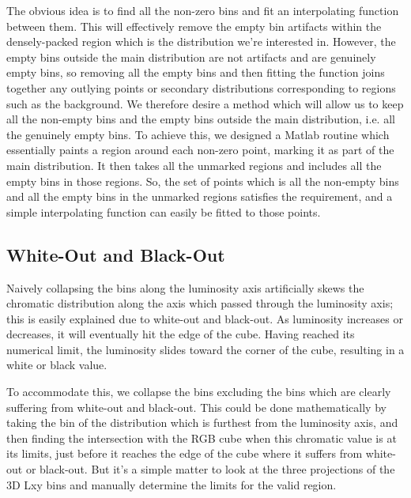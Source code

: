 The obvious idea is to find all the non-zero bins and fit an interpolating function between them. This will effectively remove the empty bin artifacts within the densely-packed region which is the distribution we're interested in. However, the empty bins outside the main distribution are not artifacts and are genuinely empty bins, so removing all the empty bins and then fitting the function joins together any outlying points or secondary distributions corresponding to regions such as the background. We therefore desire a method which will allow us to keep all the non-empty bins and the empty bins outside the main distribution, i.e. all the genuinely empty bins. To achieve this, we designed a Matlab routine which essentially paints a region around each non-zero point, marking it as part of the main distribution. It then takes all the unmarked regions and includes all the empty bins in those regions. So, the set of points which is all the non-empty bins and all the empty bins in the unmarked regions satisfies the requirement, and a simple interpolating function can easily be fitted to those points.


\subsection{White-Out and Black-Out}\label{sec:WhiteOutBlackOut}

Naively collapsing the bins along the luminosity axis artificially skews the chromatic distribution along the axis which passed through the luminosity axis; this is easily explained due to white-out and black-out. As luminosity increases or decreases, it will eventually hit the edge of the cube. Having reached its numerical limit, the luminosity slides toward the corner of the cube, resulting in a white or black value.

To accommodate this, we collapse the bins excluding the bins which are clearly suffering from white-out and black-out. This could be done mathematically by taking the bin of the distribution which is furthest from the luminosity axis, and then finding the intersection with the RGB cube when this chromatic value is at its limits, just before it reaches the edge of the cube where it suffers from white-out or black-out. But it's a simple matter to look at the three projections of the 3D Lxy bins and manually determine the limits for the valid region.



